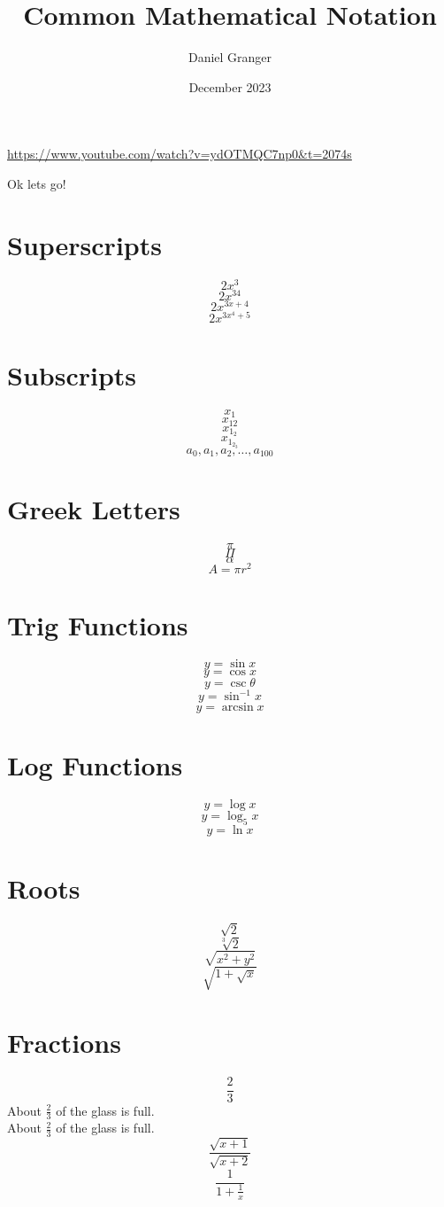 \documentclass[11pt]{article}
\title{Common Mathematical Notation}
\author{Daniel Granger}
\date{December 2023}
\begin{document}
\maketitle
\url{https://www.youtube.com/watch?v=ydOTMQC7np0&t=2074s}

Ok lets go!

\section{Superscripts}
\[2x^3\]
\[2x^{34}\]
\[2x^{3x+4}\]
\[2x^{3x^4+5}\]

\section{Subscripts}
\[x_1\]
\[x_{12}\]
\[x_{1_2}\]
\[x_{1_{2_3}}\]
\[a_0, a_1, a_2, \ldots, a_{100}\]

\section{Greek Letters}
\[\pi\]
\[\Pi\]
\[\alpha\]
\[A=\pi r^2\]

\section{Trig Functions}
\[y=\sin x\]
\[y=\cos x\]
\[y=\csc \theta\]
\[y=\sin^{-1} x\]
\[y=\arcsin x\]

\section{Log Functions}
\[y=\log x\]
\[y=\log_5 x\]
\[y=\ln x\]

\section{Roots}
\[\sqrt{2}\]
\[\sqrt[3]{2}\]
\[\sqrt{x^2+y^2}\]
\[\sqrt{1+\sqrt{x}}\]

\section{Fractions}
\[\frac{2}{3}\]
About \(\frac{2}{3}\) of the glass is full. \\[6pt]
About \(\displaystyle \frac{2}{3}\) of the glass is full.
\[\frac{\sqrt{x+1}}{\sqrt{x+2}}\]
\[\frac{1}{1+\frac{1}{x}}\]
\end{document}

